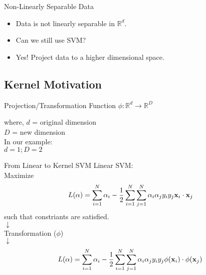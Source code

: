 \documentclass{beamer}
\begin{document}
\begin{frame}{Non-Linearly Separable Data}
	\begin{itemize}
		\item Data is not linearly separable in $\mathbb{R}^d$.
		\item Can we still use SVM?
		\item Yes! Project data to a higher dimensional space.
	\end{itemize}
	\end{frame}

\subsection{Kernel Motivation}

{
	
}

\begin{frame}{Projection/Transformation Function}
	        $\phi : \mathbb{R}^{d} \rightarrow \mathbb{R}^{D}$
	    
	    where, $d$ = original dimension \\
	    \hspace{1cm} $D$ = new dimension \\
	    In our example:\\
	    \hspace{1cm} $d = 1; D = 2$ 
	\end{frame}
	\begin{frame}{From Linear to Kernel SVM}
	    Linear SVM:\\
	    \hspace{1cm} Maximize\\
	    \begin{equation*}
	        L(\alpha) = \sum_{i=1}^{N}\alpha_{i} - \frac{1}{2}\sum_{i=1}^{N}\sum_{j=1}^{N}\alpha_{i}\alpha_{j}y_{i}y_{j}\mathbf{x}_{i} \cdot \mathbf{x}_{j}
	    \end{equation*}
	    \hspace{1cm} such that constriants are satisfied.\\
	   \hspace{5cm} $\downarrow$\\
	   \hspace{3.8cm} Transformation ($\phi$)\\
	   \hspace{5cm} $\downarrow$\\
	   \begin{equation*}
	       L(\alpha) = \sum_{i=1}^{N}\alpha_{i} - \frac{1}{2}\sum_{i=1}^{N}\sum_{j=1}^{N}\alpha_{i}\alpha_{j}y_{i}y_{j}\phi(\mathbf{x}_{i}) \cdot \phi(\mathbf{x}_{j})
	   \end{equation*}
	\end{frame}
\end{document}
